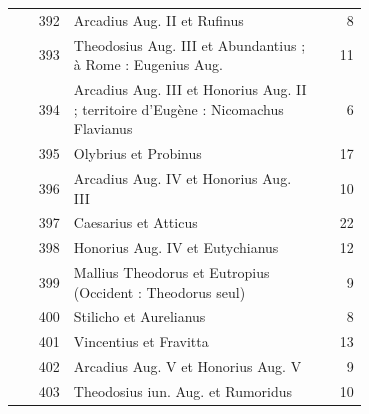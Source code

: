 \begin{longtable}{@{}r p{0.70\linewidth} r@{}}
392 & Arcadius Aug. II et Rufinus & 8 \\
393 & Theodosius Aug. III et Abundantius ; à Rome : Eugenius Aug. & 11 \\
394 & Arcadius Aug. III et Honorius Aug. II ; territoire d'Eugène : Nicomachus Flavianus & 6 \\
395 & Olybrius et Probinus & 17 \\
396 & Arcadius Aug. IV et Honorius Aug. III & 10 \\
397 & Caesarius et Atticus & 22 \\
398 & Honorius Aug. IV et Eutychianus & 12 \\
399 & Mallius Theodorus et Eutropius (Occident : Theodorus seul) & 9 \\
400 & Stilicho et Aurelianus & 8 \\
401 & Vincentius et Fravitta & 13 \\
402 & Arcadius Aug. V et Honorius Aug. V & 9 \\
403 & Theodosius iun. Aug. et Rumoridus & 10 \\
\end{longtable}
